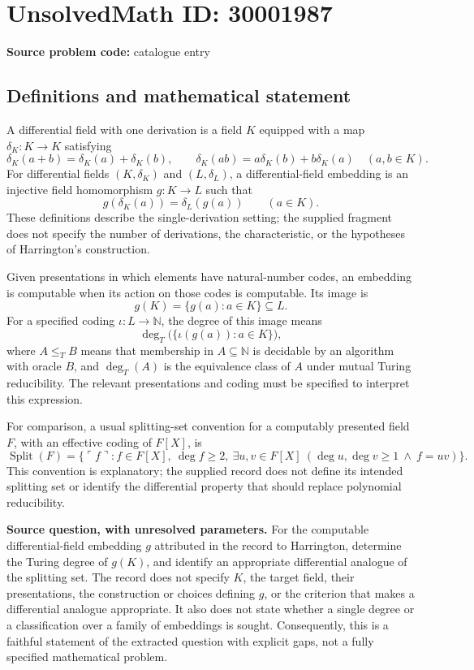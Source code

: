 \documentclass[11pt]{article}
\newcommand{\N}{\mathbb{N}}
\begin{document}
\section*{UnsolvedMath ID: 30001987}
\textbf{Source problem code:} catalogue entry
\subsection{Definitions and mathematical statement}
A differential field with one derivation is a field \(K\) equipped with a map \(\delta_K:K\to K\) satisfying
\[
\delta_K(a+b)=\delta_K(a)+\delta_K(b),\qquad
\delta_K(ab)=a\delta_K(b)+b\delta_K(a)
\quad(a,b\in K).
\]
For differential fields \((K,\delta_K)\) and \((L,\delta_L)\), a differential-field embedding is an injective field homomorphism \(g:K\to L\) such that
\[
g(\delta_K(a))=\delta_L(g(a))\qquad(a\in K).
\]
These definitions describe the single-derivation setting; the supplied fragment does not specify the number of derivations, the characteristic, or the hypotheses of Harrington's construction.

Given presentations in which elements have natural-number codes, an embedding is computable when its action on those codes is computable. Its image is
\[
g(K)=\{g(a):a\in K\}\subseteq L.
\]
For a specified coding \(\iota:L\to\N\), the degree of this image means
\[
\deg_T\bigl(\{\iota(g(a)):a\in K\}\bigr),
\]
where \(A\leq_T B\) means that membership in \(A\subseteq\N\) is decidable by an algorithm with oracle \(B\), and \(\deg_T(A)\) is the equivalence class of \(A\) under mutual Turing reducibility. The relevant presentations and coding must be specified to interpret this expression.

For comparison, a usual splitting-set convention for a computably presented field \(F\), with an effective coding of \(F[X]\), is
\[
\operatorname{Split}(F)=
\{\ulcorner f\urcorner: f\in F[X],\ \deg f\geq2,
\ \exists u,v\in F[X]\ (\deg u,\deg v\geq1\ \land\ f=uv)\}.
\]
This convention is explanatory; the supplied record does not define its intended splitting set or identify the differential property that should replace polynomial reducibility.

\textbf{Source question, with unresolved parameters.} For the computable differential-field embedding \(g\) attributed in the record to Harrington, determine the Turing degree of \(g(K)\), and identify an appropriate differential analogue of the splitting set. The record does not specify \(K\), the target field, their presentations, the construction or choices defining \(g\), or the criterion that makes a differential analogue appropriate. It also does not state whether a single degree or a classification over a family of embeddings is sought. Consequently, this is a faithful statement of the extracted question with explicit gaps, not a fully specified mathematical problem.
\end{document}
